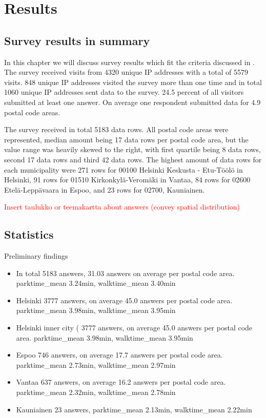 \section{Results}
\subsection{Survey results in summary}
\justify

In this chapter we will discuss survey results which fit the criteria discussed in \hyperref[sec:processdata]{}. The survey received visits from 4320 unique IP addresses with a total of 5579 visits. 848 unique IP addresses visited the survey more than one time and in total 1060 unique IP addresses sent data to the survey. 24.5 percent of all visitors submitted at least one answer. On average one respondent submitted data for 4.9 postal code areas. 

The survey received in total 5183 data rows. All postal code areas were represented, median amount being 17 data rows per postal code area, but the value range was heavily skewed to the right, with first quartile being 8 data rows, second 17 data rows and third 42 data rows. The highest amount of data rows for each municipality were 271 rows for 00100 Helsinki Keskusta - Etu-Töölö in Helsinki, 91 rows for 01510 Kirkonkylä-Veromäki in Vantaa, 84 rows for 02600 Etelä-Leppävaara in Espoo, and 23 rows for 02700, Kauniainen.

\textcolor{red}{Insert taulukko or teemakartta about answers (convey spatial distribution)}

\subsection{Statistics}
\justify

Preliminary findings
\begin{itemize}
    \item In total 5183 answers, 31.03 answers on average per postal code area. parktime\_mean 3.24min, walktime\_mean 3.40min
    \item Helsinki 3777 answers, on average 45.0 answers per postal code area. parktime\_mean 3.98min, walktime\_mean 3.95min
    \item Helsinki inner city ( 3777 answers, on average 45.0 answers per postal code area. parktime\_mean 3.98min, walktime\_mean 3.95min
    \item Espoo 746 answers, on average 17.7 answers per postal code area. parktime\_mean 2.73min, walktime\_mean 2.97min
    \item Vantaa 637 answers, on average 16.2 answers per postal code area. parktime\_mean 2.32min, walktime\_mean 2.78min
    \item Kauniainen 23 answers, parktime\_mean 2.13min, walktime\_mean 2.22min
\end{itemize}
